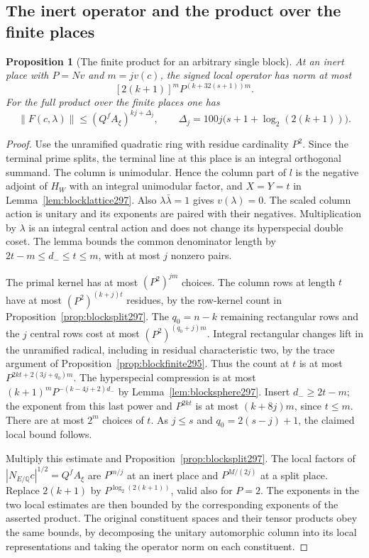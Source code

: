 \documentclass[a4paper,11pt]{article}
\newtheorem{proposition}{Proposition}[section]
\theoremstyle{definition}
\theoremstyle{remark}
\numberwithin{equation}{section}
\begin{document}
\subsection{The inert operator and the product over the finite places}\label{nav:V-53}
\begin{proposition}[The finite product for an arbitrary single block]\leavevmode
\label{prop:blockfinite297}
At an inert place with \(P=Nv\) and \(m=jv(c)\), the signed
local operator has norm at most
\[
              [2(k+1)]^m P^{(k+32(s+1))m}.
\]
For the full product over the finite places one has
\[
  \|F(c,\lambda)\|\le (Q^f A_\xi)^{kj+\Delta_j},\qquad
  \Delta_j=100j\bigl(s+1+\log_2(2(k+1))\bigr).
\]
\end{proposition}
\begin{proof}
Use the unramified quadratic ring with residue cardinality
\(P^2\). Since the terminal prime splits, the terminal line
at this place is an integral orthogonal summand. The column
is unimodular. Hence the column part of \(l\) is the negative
adjoint of \(H_W\) with an integral unimodular factor, and
\(X=Y=t\) in Lemma~\ref{lem:blocklattice297}. Also
\(\lambda\bar\lambda=1\) gives \(v(\lambda)=0\).
The scaled column action is unitary and its exponents are
paired with their negatives. Multiplication by \(\lambda\)
is an integral central action and does not change its
hyperspecial double coset. The lemma bounds the common
denominator length by \(2t-m\le d_-\le t\le m\), with
at most \(j\) nonzero pairs.

The primal kernel has at most \((P^2)^{jm}\) choices.
The column rows at length \(t\) have at most
\((P^2)^{(k+j)t}\) residues, by the row-kernel count in
Proposition~\ref{prop:blocksplit297}. The \(q_0=n-k\)
remaining rectangular rows and the \(j\) central rows cost
at most \((P^2)^{(q_0+j)m}\). Integral rectangular changes
lift in the unramified radical, including in residual
characteristic two, by the trace argument of
Proposition~\ref{prop:blockfinite295}. Thus the count at
\(t\) is at most \(P^{2kt+2(3j+q_0)m}\). The hyperspecial
compression is at most \((k+1)^m P^{-(k-4j+2)d_-}\)
by Lemma~\ref{lem:blocksphere297}. Insert \(d_-\ge2t-m\);
the exponent from this last power and \(P^{2kt}\) is at
most \((k+8j)m\), since \(t\le m\). There are at most
\(2^m\) choices of \(t\). As \(j\le s\) and \(q_0=2(s-j)+1\),
the claimed local bound follows.

Multiply this estimate and Proposition~\ref{prop:blocksplit297}.
The local factors of \(|N_{E/\mathbb Q}c|^{1/2}=Q^f A_\xi\)
are \(P^{m/j}\) at an inert place and \(P^{M/(2j)}\) at a
split place. Replace \(2(k+1)\) by
\(P^{\log_2(2(k+1))}\), valid also for \(P=2\). The
exponents in the two local estimates are then bounded by
the corresponding exponents of the asserted product.
The original constituent spaces and their tensor products
obey the same bounds, by decomposing the unitary
automorphic column into its local representations and
taking the operator norm on each constituent.
\end{proof}
\end{document}
